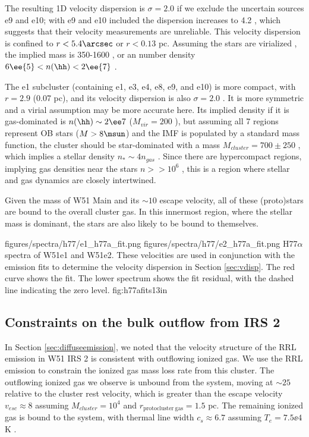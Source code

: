 The resulting 1D velocity dispersion is $\sigma=2.0$ \kms if we exclude
the uncertain sources e9
and e10; with e9 and e10 included the dispersion increases to 4.2 \kms, which
suggests that their velocity
measurements  are unreliable.  This velocity dispersion is confined to
$r<5.4\arcsec$ or $r<0.13$ pc.  Assuming the stars are virialized \citep[which
is a good assumption if the stellar mass is dominant;][]{Kruijssen2012b}, the
implied mass is 350-1600 \msun, or an \hh number density $6\ee{5} < n(\hh) <
2\ee{7}$ \percc.

The e1 subcluster (containing e1, e3, e4, e8, e9, and e10)  is more compact,
with $r=2.9$ \arcsec (0.07 pc), and its
velocity dispersion is also $\sigma=2.0$ \kms.  It is more symmetric and a virial
assumption may be more accurate here.  Its implied density if it is gas-dominated
is $n(\hh)\sim2\ee7$ \percc ($M_{vir}=200$ \msun), but assuming all 7 \hchii
regions represent OB stars ($M>8\msun$) and the IMF is populated by a standard
\citet{Kroupa2001a} mass function, the cluster should be star-dominated with a
mass $M_{cluster}=700\pm250$ \msun, which implies a stellar density $n_* \sim 4
n_{gas}$ \citep[similar to the mass ratio obtained in the simulations
of][]{Kruijssen2012b}.  Since there are hypercompact \hii regions,
implying gas densities near the stars $n>>10^6$ \percc, this is a region where
stellar and gas dynamics are closely intertwined.

Given the mass of W51 Main and its $\sim10$ \kms escape velocity, all of these
(proto)stars are bound to the overall cluster gas.  In this innermost region,
where the stellar mass is dominant, the stars are also likely to be bound to
themselves.

\FigureTwo
{figures/spectra/h77/e1_h77a_fit.png}
{figures/spectra/h77/e2_h77a_fit.png}
{H77$\alpha$ spectra of W51e1 and W51e2.  These velocities are used in
conjunction with the \formaldehyde emission fits to determine the velocity
dispersion in Section \ref{sec:vdisp}.
The red curve shows the fit.  The lower spectrum shows the fit residual, with
the dashed line indicating the zero level.  
}
{fig:h77afits}{1}{3in}

\subsection{Constraints on the bulk outflow from IRS 2}
\label{sec:irs2outflow}
In Section \ref{sec:diffuseemission}, we noted that the velocity structure of
the RRL emission in W51 IRS 2 is consistent with outflowing ionized gas.  We use
the RRL emission to constrain the ionized gas mass loss rate from this cluster.
The outflowing ionized gas we observe is unbound from the system, moving at
$\sim25$ \kms relative to the cluster rest velocity, which is greater than the
escape velocity $v_{esc}\approx8$ \kms assuming $M_{cluster}=10^4$ \msun and
$r_{\mathrm{protocluster~gas}}=1.5$ pc.  The remaining ionized gas is bound to the system, with
thermal line width $c_s\approx6.7$ \kms assuming $T_e=7.5\ee{4}$ K \citep{Ginsburg2015a}.

